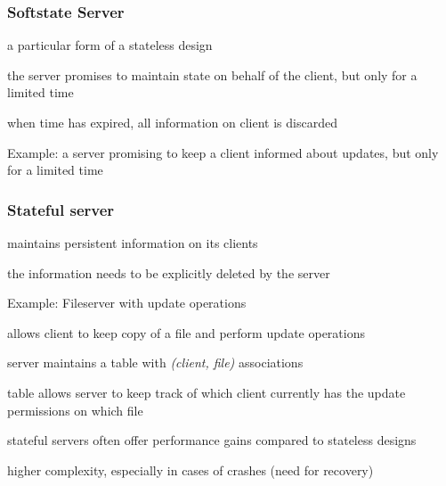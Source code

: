\subsubsection{Softstate Server}

\begin{compactitem}
	\item a particular form of a stateless design
	\item the server promises to maintain state on behalf of the client, but only for a limited time
	\item when time has expired, all information on client is discarded
	\item Example: a server promising to keep a client informed about updates, but only for a limited time
\end{compactitem}

\subsubsection{Stateful server}

\begin{compactitem}
	\item maintains persistent information on its clients
	\item the information needs to be explicitly deleted by the server
	\item Example: Fileserver with update operations
	\begin{compactitem}
		\item allows client to keep copy of a file and perform update operations
		\item server maintains a table with \emph{(client, file)} associations
		\item table allows server to keep track of which client currently has the update permissions on which file
	\end{compactitem}
	\item stateful servers often offer performance gains compared to stateless designs 
	\item higher complexity, especially in cases of crashes (need for recovery)
\end{compactitem}

